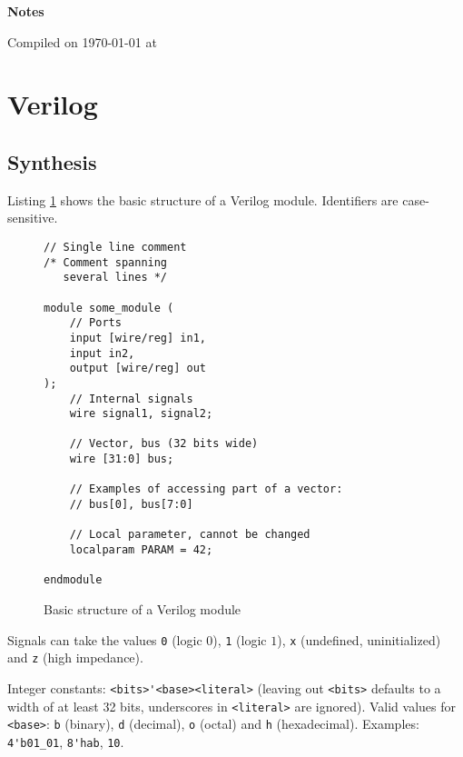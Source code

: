 \documentclass[fontsize=11pt,a4paper]{scrartcl}
\begin{document}
\clearpage
\begingroup
	\pagestyle{empty}
	\begin{center}
		\LARGE{\textbf{Notes}}

		\small{Compiled on {\today} at \currenttime}
	\end{center}
	\hfill
	\tableofcontents
	\clearpage
\endgroup
\newpage
\setcounter{page}{1}
%
%
%
%
\lstset{numbers=left,
	frame=single,
	numberstyle=\tiny,
	basicstyle=\footnotesize,
	showstringspaces=false,
	tabsize=3,
	numbersep=5pt,
}
%
%
%
\section{Verilog}
\subsection{Synthesis}
\lstset{language=verilog}
Listing \ref{lst:basic_structure} shows the basic structure of a Verilog module. Identifiers are case-sensitive.
\begin{figure}[htb]
\begin{lstlisting}
// Single line comment
/* Comment spanning
   several lines */

module some_module (
	// Ports
	input [wire/reg] in1,
	input in2,
	output [wire/reg] out
);
	// Internal signals
	wire signal1, signal2;

	// Vector, bus (32 bits wide)
	wire [31:0] bus;

	// Examples of accessing part of a vector:
	// bus[0], bus[7:0]

	// Local parameter, cannot be changed
	localparam PARAM = 42;

endmodule
\end{lstlisting}
\caption{Basic structure of a Verilog module}
\label{lst:basic_structure}
\end{figure}

Signals can take the values \lstinline!0! (logic $0$), \lstinline!1! (logic $1$), \lstinline!x! (undefined, uninitialized) and \lstinline!z! (high impedance).

Integer constants: \lstinline!<bits>'<base><literal>! (leaving out \lstinline!<bits>! defaults to a width of at least 32 bits, underscores in \lstinline!<literal>! are ignored). Valid values for \lstinline!<base>!: \lstinline!b! (binary), \lstinline!d! (decimal), \lstinline!o! (octal) and \lstinline!h! (hexadecimal). Examples: \lstinline!4'b01_01!, \lstinline!8'hab!, \lstinline!10!.
\end{document}
